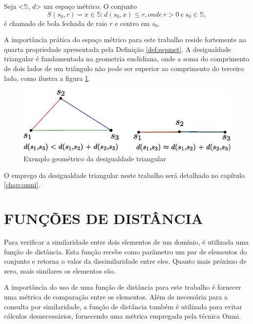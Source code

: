 \begin{mydef}
 \label{def:bola}
 Seja <$\mathbb{S}$, $d$> um espaço métrico. O conjunto
 \begin{equation}
  S(s_0,r) = {x \in \mathbb{S} : d(s_0, x) \leq r},	onde\ r > 0\ e\ s_0 \in \mathbb{S},
 \end{equation}
  é chamado de bola fechada de raio $r$ e centro em $s_0$. 
\end{mydef}

A importância prática do espaço métrico para este trabalho reside fortemente na quarta propriedade apresentada pela Definição \ref{def:espmet}. A desigualdade triangular é fundamentada na geometria euclidiana, 
onde a soma do comprimento de dois lados de um triângulo não pode ser superior ao comprimento do terceiro lado, como ilustra a figura \ref{fig:destri}.

\begin{figure}[H]
\centering
\includegraphics[width=.8\textwidth]{dados/figuras/desig_tri.eps}
\caption{Exemplo geométrico da desigualdade triangular}
\label{fig:destri}
\end{figure}

O emprego da desigualdade triangular neste trabalho será detalhado no capítulo \ref{chap:omni}.

\section{FUNÇÕES DE DISTÂNCIA}
\label{sec:funcdist}
Para verificar a similaridade entre dois elementos de um domínio, é utilizada uma função de distância. Esta função recebe como parâmetro um par
de elementos do conjunto e retorna o valor da dissimilaridade entre eles. Quanto mais próximo de zero, mais similares os elementos são.\par

A importância do uso de uma função de distância para este trabalho é fornecer uma métrica de comparação entre os elementos. Além de
necessária para a consulta por similaridade, a função de distância também é utilizada para evitar cálculos desnecessários, fornecendo uma métrica
empregada pela técnica Omni.\par
